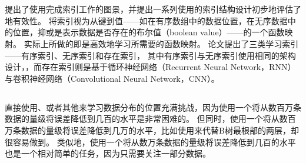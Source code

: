 
\section{\li}

{\li}提出了使用{\model}完成索引工作的图景，并提出一系列使用{\model}的索引结构设计初步地评估了{\li}地有效性。
{\li}将索引视为从键到值——如在有序数组中的数据位置，在无序数据中的位置，抑或是表示数据是否存在的布尔值（boolean value）——的一个函数映射。
{\li}实际上所做的即是高效地学习所需要的函数映射。
论文提出了三类学习索引{------}有序索引、无序索引和存在索引，
其中有序索引与无序索引使用相同的架构设计，{\rmi}，而存在索引则是基于循环神经网络（Recurrent Neural Network，RNN）与卷积神经网络（Convolutional Neural Network，CNN）。

\subsection{{\rmi}}
\label{sec:rmi}

直接使用{\lr}、{\nn}或者其他{\model}来学习数据分布的位置充满挑战，因为使用一个{\model}将从数百万条数据的量级将误差降低到几百的水平是非常困难的。
但同时，使用一个{\model}将从数百万条数据的量级将误差降低到几万的水平，比如使用{\model}来代替B树最根部的两层，却很容易做到。
类似地，使用一个{\model}将从数万条数据的量级将误差降低到几百的水平也是一个相对简单的任务，因为{\model}只需要关注一部分数据。

